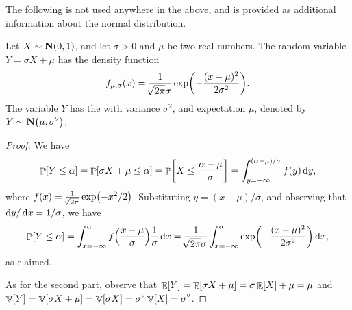 The following is not used anywhere in the above, and is provided as
additional information about the normal distribution.

\begin{lemma}
    Let $X \sim \NormalY{0}{1}$, and let $\sigma > 0$ and $\mu$ be two
    real numbers. The random variable $Y = \sigma X + \mu$ has the
    density function
    \begin{equation}
        f_{\mu,\sigma}(x) = \frac{1}{\mysqrt{2\pi} \sigma} \exp\pth{
           -\frac{(x-\mu)^2}{2\sigma^2}}.
        \eqlab{normal:density:g}
    \end{equation}
    The variable $Y$ has the  with variance
    $\sigma^2$, and expectation $\mu$, denoted by
    $Y \sim \NormalY{\mu}{\sigma^2}$.
\end{lemma}
\begin{proof}
    We have
    \begin{equation*}
        \Prob{Y \leq \alpha}%
        =%
        \Prob{\sigma X + \mu \leq \alpha}%
        =%
        \Prob{ X \leq \frac{\alpha-\mu}{\sigma}}%
        =%
        \int_{y=-\infty}^{(\alpha-\mu)/{\sigma}} f(y) \diffX{y},
    \end{equation*}
    where $f(x) = \frac{1}{\mysqrt{2\pi}} \exp \pth{ -x^2/2}$.
    Substituting $y= (x - \mu)/\sigma$, and observing that
    $\mathop{}\!\mathrm{d}y/\mathop{}\!\mathrm{d}x = 1/\sigma$, we have
    \begin{equation*}
        \Prob{Y \leq \alpha}%
        =%
        \int_{x=-\infty}^{\alpha} f\Bigl( \frac{x-\mu}{\sigma} \Bigr)
        \frac{1}{\sigma} \diffX{x}%
        =%
        \frac{1}{\mysqrt{2\pi} \sigma}
        \int_{x=-\infty}^{\alpha} 
        \exp \pth{ -\frac{(x-\mu)^2}{2\sigma^2}} \diffX{x},
    \end{equation*}
    as claimed.

    As for the second part, observe that
    $\mathop{\mathbb{E}}\!\left[ {Y} \right] = \mathop{\mathbb{E}}\!\left[ {\sigma X + \mu } \right] = \sigma\mathop{\mathbb{E}}\!\left[ {X} \right] + \mu = \mu$ and
    $\mathop{\mathbb{V}}\!\left[ {Y} \right] = \mathop{\mathbb{V}}\!\left[ {\sigma X + \mu } \right] = \mathop{\mathbb{V}}\!\left[ {\sigma X } \right] = \sigma^2
    \mathop{\mathbb{V}}\!\left[ {X} \right] = \sigma^2$.
\end{proof}



